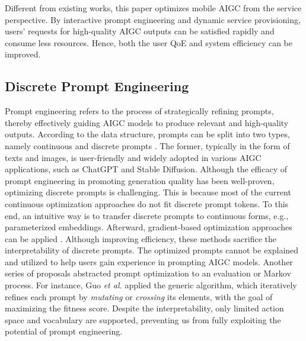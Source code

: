 Different from existing works, this paper optimizes mobile AIGC from the service perspective.
By interactive prompt engineering and dynamic service provisioning, users' requests for high-quality AIGC outputs can be satisfied rapidly and consume less resources.
Hence, both the user QoE and system efficiency can be improved.

\subsection{Discrete Prompt Engineering}
Prompt engineering refers to the process of strategically refining prompts, thereby effectively guiding AIGC models to produce relevant and high-quality outputs.
According to the data structure, prompts can be split into two types, namely continuous and discrete prompts \cite{10.1145/3560815}.
The former, typically in the form of texts and images, is user-friendly and widely adopted in various AIGC applications, such as ChatGPT and Stable Diffusion.
Although the efficacy of prompt engineering in promoting generation quality has been well-proven, optimizing discrete prompts is challenging.
This is because most of the current continuous optimization approaches do not fit discrete prompt tokens.
To this end, an intuitive way is to transfer discrete prompts to continuous forms, e.g., parameterized embeddings.
Afterward, gradient-based optimization approaches can be applied \cite{wen2023hard, 10210127, ACL}.
Although improving efficiency, these methods sacrifice the interpretability of discrete prompts.
The optimized prompts cannot be explained and utilized to help users gain experience in prompting AIGC models.
Another series of proposals \cite{2309.08532, Evoprompting, deng-etal-2022-rlprompt} abstracted prompt optimization to an evaluation or Markov process.
For instance, Guo \textit{et al.} \cite{2309.08532} applied the generic algorithm, which iteratively refines each prompt by \textit{mutating} or \textit{crossing} its elements, with the goal of maximizing the fitness score.
Despite the interpretability, only limited action space and vocabulary are supported, preventing us from fully exploiting the potential of prompt engineering.

